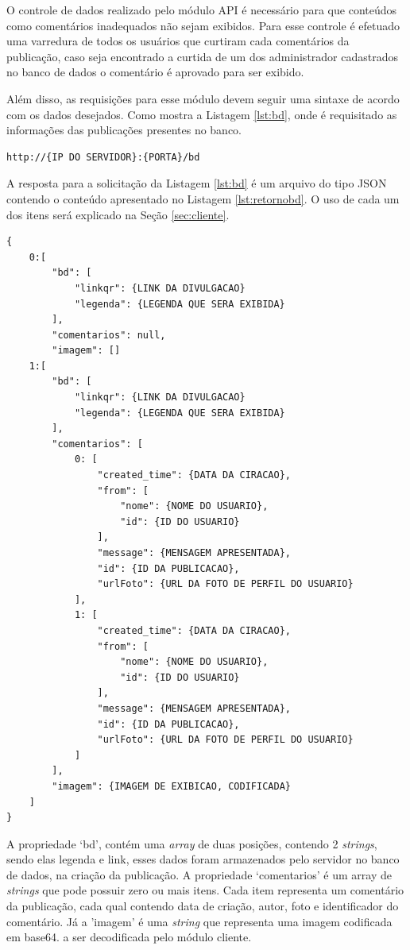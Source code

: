 O controle de dados realizado pelo módulo API é necessário para que conteúdos como comentários inadequados não sejam exibidos. Para esse controle é efetuado uma varredura de todos os usuários que curtiram cada comentários da publicação, caso seja encontrado a curtida de um dos administrador cadastrados no banco de dados o comentário é aprovado para ser exibido.

Além disso, as requisições para esse módulo devem seguir uma sintaxe de acordo com os dados desejados. Como mostra a Listagem \ref{lst:bd}, onde é requisitado as informações das publicações presentes no banco.

\begin{lstlisting}[caption={Requisitando dados para divulgação},label={lst:bd}]
	http://{IP DO SERVIDOR}:{PORTA}/bd
\end{lstlisting}

A resposta para a solicitação da Listagem \ref{lst:bd} é um arquivo do tipo JSON contendo o conteúdo apresentado no Listagem \ref{lst:retornobd}. O uso de cada um dos itens será explicado na Seção \ref{sec:cliente}.

\begin{lstlisting}[caption={Retorno da requisição \ref{lst:bd}},label={lst:retornobd}]
{
	0:[
		"bd": [
			"linkqr": {LINK DA DIVULGACAO}
			"legenda": {LEGENDA QUE SERA EXIBIDA}		
		],
		"comentarios": null,
		"imagem": []
	1:[
		"bd": [
			"linkqr": {LINK DA DIVULGACAO}
			"legenda": {LEGENDA QUE SERA EXIBIDA}
		],
		"comentarios": [
			0: [
				"created_time": {DATA DA CIRACAO},
				"from": [
					"nome": {NOME DO USUARIO},
					"id": {ID DO USUARIO}
				],
				"message": {MENSAGEM APRESENTADA},
				"id": {ID DA PUBLICACAO},
				"urlFoto": {URL DA FOTO DE PERFIL DO USUARIO}
			],
			1: [
				"created_time": {DATA DA CIRACAO},
				"from": [
					"nome": {NOME DO USUARIO},
					"id": {ID DO USUARIO}
				],
				"message": {MENSAGEM APRESENTADA},
				"id": {ID DA PUBLICACAO},
				"urlFoto": {URL DA FOTO DE PERFIL DO USUARIO}
			]
		],
		"imagem": {IMAGEM DE EXIBICAO, CODIFICADA}
	]
}
\end{lstlisting}

A propriedade `bd', contém uma \textit{array} de duas posições, contendo 2 \textit{strings}, sendo elas legenda e link, esses dados foram armazenados pelo servidor no banco de dados, na criação da publicação. A propriedade `comentarios' é um array de \textit{strings} que pode possuir zero ou mais itens. Cada item representa um comentário da publicação, cada qual contendo data de criação, autor, foto e identificador do comentário. Já a 'imagem' é uma \textit{string} que representa uma imagem codificada em base64. a ser decodificada pelo módulo cliente.

